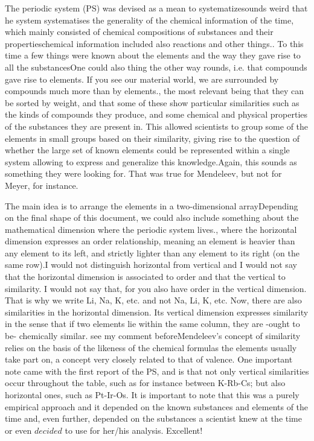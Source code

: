 \documentclass[]{article}
\newcommand{\gr}[1]{{\color{red}#1}}
\begin{document}
The periodic system (PS) was devised as a mean to systematize\gr{sounds weird that he system systematises} the generality of the chemical information of the time, which mainly consisted of chemical compositions of substances and their properties\gr{chemical information included also reactions and other things.}. To this time a few things were known about the elements and the way they gave rise to all the substances\gr{One could also thing the other way rounds, i.e. that compounds gave rise to elements.  If you see our material world, we are surrounded by compounds much more than by elements.}, the most relevant being that they can be sorted by weight, and that some of these show particular similarities such as the kinds of compounds they produce, and some chemical and physical properties of the substances they are present in. This allowed scientists to group some of the elements in small groups based on their similarity, giving rise to the question of whether the large set of known elements could be represented within a single system allowing to express and generalize this knowledge.\gr{Again, this sounds as something they were looking for.  That was true for Mendeleev, but not for Meyer, for instance.}

The main idea is to arrange the elements in a two-dimensional array\gr{Depending on the final shape of this document, we could also include something about the mathematical dimension where the periodic system lives.}, where the horizontal dimension expresses an order relationship, meaning an element is heavier than any element to its left, and strictly lighter than any element to its right (on the same row).\gr{I would not distinguish horizontal from vertical and I would not say that the horizontal dimension is associated to order and that the vertical to similarity.  I would not say that, for you also have order in the vertical dimension.  That is why we write Li, Na, K, etc. and not Na, Li, K, etc.  Now, there are also similarities in the horizontal dimension.} Its vertical dimension expresses similarity in the sense that if two elements lie within the same column, they are -ought to be- chemically similar. \gr{see my comment before}Mendeleev's concept of similarity relies on the basis of the likeness of the chemical formulas the elements usually take part on, a concept very closely related to that of valence. One important note came with the first report of the PS, and is that not only vertical similarities occur throughout the table, such as for instance between K-Rb-Cs; but also horizontal ones, such as Pt-Ir-Os. It is important to note that this was a purely empirical approach and it depended on the known substances and elements of the time and, even further, depended on the substances a scientist knew at the time or even $\textit{decided}$ to use for her/his analysis. \gr{Excellent!}
\end{document}

